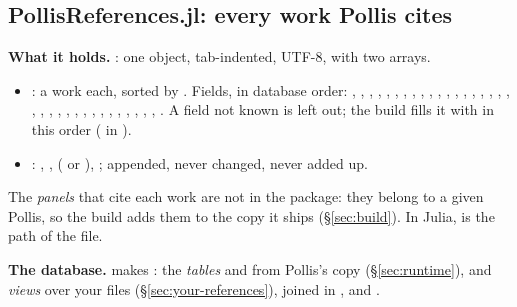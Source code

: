 \subsection{PollisReferences.jl: every work Pollis cites}
\textbf{What it holds.} : one object, tab-indented, UTF-8, with two arrays.
\begin{itemize}
  \item {}: a work each, sorted by . Fields, in database order: , ,
    , , , , , ,
    , , , , , , ,
    , , , , , , ,
    , , , , , , ,
    , , , , , . A field
    not known is left out; the build fills it with  in this order ( in
    ).
  \item {}: , ,  ( or ), ;
    appended, never changed, never added up.
\end{itemize}
The \emph{panels} that cite each work are not in the package: they belong to a given Pollis, so the build adds them to
the copy it ships (\S\ref{sec:build}). In Julia,  is the path of the file.

\textbf{The database.}  makes : the \emph{tables}
 and  from Pollis's copy (\S\ref{sec:runtime}), and \emph{views} over your
files (\S\ref{sec:your-references}), joined in ,  and .

